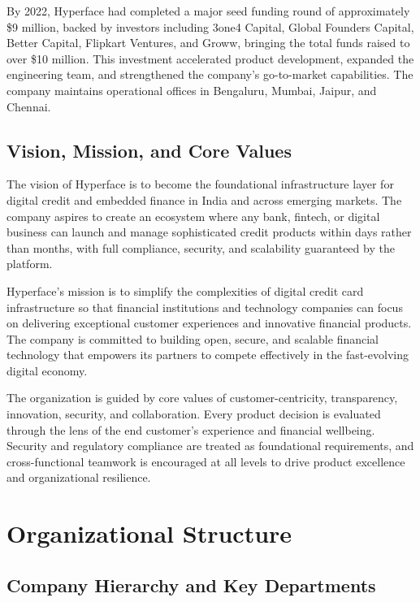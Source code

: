By 2022, Hyperface had completed a major seed funding round of approximately \$9 million, backed by investors including 3one4 Capital, Global Founders Capital, Better Capital, Flipkart Ventures, and Groww, bringing the total funds raised to over \$10 million. This investment accelerated product development, expanded the engineering team, and strengthened the company's go-to-market capabilities. The company maintains operational offices in Bengaluru, Mumbai, Jaipur, and Chennai.

\subsection{Vision, Mission, and Core Values}

The vision of Hyperface is to become the foundational infrastructure layer for digital credit and embedded finance in India and across emerging markets. The company aspires to create an ecosystem where any bank, fintech, or digital business can launch and manage sophisticated credit products within days rather than months, with full compliance, security, and scalability guaranteed by the platform.

Hyperface's mission is to simplify the complexities of digital credit card infrastructure so that financial institutions and technology companies can focus on delivering exceptional customer experiences and innovative financial products. The company is committed to building open, secure, and scalable financial technology that empowers its partners to compete effectively in the fast-evolving digital economy.

The organization is guided by core values of customer-centricity, transparency, innovation, security, and collaboration. Every product decision is evaluated through the lens of the end customer's experience and financial wellbeing. Security and regulatory compliance are treated as foundational requirements, and cross-functional teamwork is encouraged at all levels to drive product excellence and organizational resilience.

\section{Organizational Structure}

\subsection{Company Hierarchy and Key Departments}

